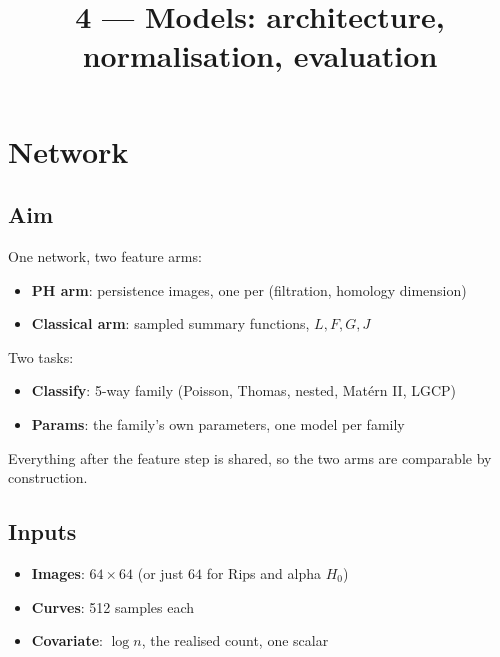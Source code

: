 \documentclass[11pt]{article}
\title{4 --- Models: architecture, normalisation, evaluation}
\date{}
\begin{document}
\maketitle

\section{Network}

\subsection*{Aim}
One network, two feature arms:
\begin{itemize}
  \item \textbf{PH arm}: persistence images, one per (filtration, homology dimension)
  \item \textbf{Classical arm}: sampled summary functions, $L,F,G,J$
\end{itemize}
Two tasks:
\begin{itemize}
  \item \textbf{Classify}: 5-way family (Poisson, Thomas, nested, Mat\'ern II, LGCP)
  \item \textbf{Params}: the family's own parameters, one model per family
\end{itemize}
Everything after the feature step is shared, so the two arms are comparable by construction.

\subsection*{Inputs}
\begin{itemize}
  \item \textbf{Images}: $64\times64$ (or just $64$ for Rips and alpha $H_0$)
  \item \textbf{Curves}: 512 samples each
  \item \textbf{Covariate}: $\log n$, the realised count, one scalar
\end{itemize}
\end{document}
